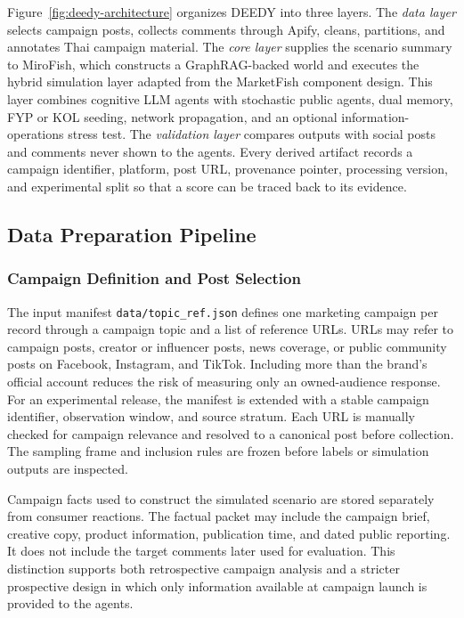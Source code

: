 \documentclass[conference]{IEEEtran}
\begin{document}
Figure~\ref{fig:deedy-architecture} organizes DEEDY into three layers. The
\emph{data layer} selects campaign posts, collects comments through Apify,
cleans, partitions, and annotates Thai campaign material. The \emph{core layer}
supplies the scenario summary to
MiroFish, which constructs a GraphRAG-backed world and executes the hybrid
simulation layer adapted from the MarketFish component design. This layer
combines cognitive LLM agents with stochastic public agents, dual memory,
FYP or KOL seeding, network propagation, and an optional information-operations
stress test. The
\emph{validation layer} compares outputs with social posts and comments never
shown to the agents. Every derived artifact records a campaign identifier,
platform, post URL, provenance pointer, processing version, and experimental
split so that a score can be traced back to its evidence.

\subsection{Data Preparation Pipeline}

\subsubsection{Campaign Definition and Post Selection}

The input manifest \texttt{data/topic\_ref.json} defines one marketing campaign
per record through a campaign topic and a list of reference URLs. URLs may
refer to campaign posts, creator or influencer posts, news coverage, or public
community posts on Facebook, Instagram, and TikTok. Including more than the
brand's official account reduces the risk of measuring only an owned-audience
response. For an experimental release, the manifest is extended with a stable
campaign identifier, observation window, and source stratum. Each URL is
manually checked for campaign relevance and resolved to a canonical post before
collection. The sampling frame and inclusion rules are frozen before labels or
simulation outputs are inspected.

Campaign facts used to construct the simulated scenario are stored separately
from consumer reactions. The factual packet may include the campaign brief,
creative copy, product information, publication time, and dated public
reporting. It does not include the target comments later used for evaluation.
This distinction supports both retrospective campaign analysis and a stricter
prospective design in which only information available at campaign launch is
provided to the agents.
\end{document}
